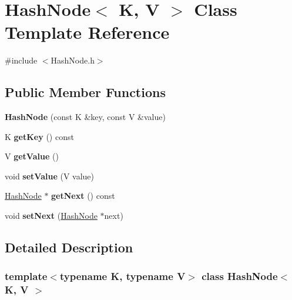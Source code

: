 \hypertarget{class_hash_node}{}\section{Hash\+Node$<$ K, V $>$ Class Template Reference}
\label{class_hash_node}


{\ttfamily \#include $<$Hash\+Node.\+h$>$}

\subsection*{Public Member Functions}
\begin{DoxyCompactItemize}
\item 
\mbox{\label{class_hash_node_a274d93360f64e94f76c260d604ce1fc0}} 
{\bfseries Hash\+Node} (const K \&key, const V \&value)
\item 
\mbox{\label{class_hash_node_afeb6b1e9b71eef17edfe6f9ebc9f47ba}} 
K {\bfseries get\+Key} () const
\item 
\mbox{\label{class_hash_node_acf4551b5c32a6848480068dec374a267}} 
V {\bfseries get\+Value} ()
\item 
\mbox{\label{class_hash_node_a6b52b6a71153980c851a35ad7dc0dbee}} 
void {\bfseries set\+Value} (V value)
\item 
\mbox{\label{class_hash_node_a644b981b90d041fd96cf19acf4b7a7cf}} 
\mbox{\hyperlink{class_hash_node}{Hash\+Node}} $\ast$ {\bfseries get\+Next} () const
\item 
\mbox{\label{class_hash_node_a1699b692e3cdf1a0807f227c4651beab}} 
void {\bfseries set\+Next} (\mbox{\hyperlink{class_hash_node}{Hash\+Node}} $\ast$next)
\end{DoxyCompactItemize}


\subsection{Detailed Description}
\subsubsection*{template$<$typename K, typename V$>$\newline
class Hash\+Node$<$ K, V $>$}

